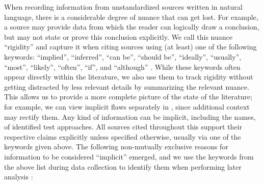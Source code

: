 When recording information from unstandardized sources written in natural
language, there is a considerable degree of nuance that can get lost. For
example, a source may provide data from which the reader can logically draw a
conclusion, but may not state or prove this conclusion explicitly.
We call this nuance ``rigidity'' and capture it when citing sources using
(at least) one of the following keywords: ``implied'', ``inferred'',
``can be'', ``should be'', ``ideally'', ``usually'', ``most'', ``likely'',
``often'', ``if'', and ``although''%
. While these keywords often appear
directly within the literature, we also use them to track rigidity without
getting distracted by less relevant details by summarizing the relevant
nuance. This allows us to provide a more complete picture of the state of
the literature; for example, we can view implicit flaws separately in
, since additional context may rectify
them. Any kind of information can be implicit, including the names,
\approachFields{} of identified test approaches. All sources cited throughout
this \docType{} support their respective
claims explicitly unless specified otherwise, usually via one of the
keywords given above. The following non-mutually
exclusive reasons for information to be considered ``implicit'' emerged, and we
use the keywords from the above list during data collection to identify them
when performing later analysis \impKeywordsCode{}:

